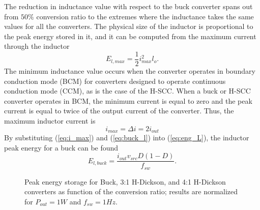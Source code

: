 The reduction in inductance value with respect to the buck converter spans out from $50\%$ conversion ratio to the extremes where the inductance takes the same values for all the converters. The physical size of the inductor is proportional to the peak energy stored in it, and it can be computed from the maximum current through the inductor
\begin{equation}
 E_{l,max}  = \frac{1}{2} i_{max}^2 l_{o}.
\label{eq:eng_L}
\end{equation}
The minimum inductance value occurs when the converter operates in boundary conduction mode (BCM) for converters designed to operate continuous conduction mode (CCM), as is the case of the H-SCC. When a buck or H-SCC converter operates in BCM, the minimum current is equal to zero and the peak current is equal to twice of the output current of the converter. Thus, the maximum inductor current is
\begin{equation}
 i_{max} = \Delta i  = 2 i_{out}
\label{eq:i_max}
\end{equation}
By substituting (\ref{eq:i_max}) and (\ref{eq:buck_l}) into (\ref{eq:eng_L}), the inductor peak energy for a buck can be found
\begin{equation}
E_{l,buck}  =   \frac{ i_{out} v_{src}  D(1-D)}{f_{sw}}.
\label{eq:e_lmax_buck}
\end{equation}
\begin{SCfigure}[][!h]
\centering
{}
\caption{Peak energy storage for Buck, 3:1 H-Dickson, and 4:1 H-Dickson converters as function of the conversion ratio;  results are normalized for $P_{out} = 1W$ and $f_{sw}=1Hz$.}
\label{fig:inductor_energy}
\end{SCfigure}
